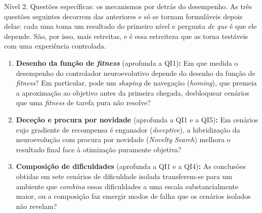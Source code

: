 \documentclass[12pt,reqno, twoside]{amsbook}
\makeatletter
\def\paragraph{\@startsection{paragraph}{4}%
  \z@\z@{-\fontdimen2\font}%
  {\normalfont\bfseries}}
\theoremstyle{plain}
\numberwithin{equation}{chapter}
\numberwithin{section}{chapter}
\numberwithin{table}{chapter}
\numberwithin{figure}{chapter}
\makeatother
\begin{document}
\paragraph{Nível 2. Questões específicas: os mecanismos por detrás do desempenho.}
As três questões seguintes decorrem das anteriores e só se tornam formuláveis depois delas: cada uma toma um resultado do primeiro nível e pergunta \emph{de que} é que ele depende. São, por isso, mais estreitas, e é essa estreiteza que as torna testáveis com uma experiência controlada.

\begin{enumerate}
    \item[\textbf{QI5.}] \textbf{Desenho da função de \textit{fitness}} (aprofunda a QI1)\textbf{:} Em que medida o desempenho do controlador neuroevolutivo depende do desenho da função de \textit{fitness}? Em particular, pode um \textit{shaping} de navegação (\textit{homing}), que premeia a aproximação ao objetivo antes da primeira chegada, desbloquear cenários que uma \textit{fitness} de tarefa pura não resolve?
    \item[\textbf{QI6.}] \textbf{Deceção e procura por novidade} (aprofunda a QI1 e a QI5)\textbf{:} Em cenários cujo gradiente de recompensa é enganador (\textit{deceptive}), a hibridização da neuroevolução com procura por novidade (\textit{Novelty Search}) melhora o resultado final face à otimização puramente objetiva?
    \item[\textbf{QI7.}] \textbf{Composição de dificuldades} (aprofunda a QI1 e a QI4)\textbf{:} As conclusões
         obtidas em sete cenários de dificuldade isolada transferem-se para um
         ambiente que \emph{combina} essas dificuldades a uma escala
         substancialmente maior, ou a composição faz emergir modos de falha que
         os cenários isolados não revelam?
\end{enumerate}
\end{document}
